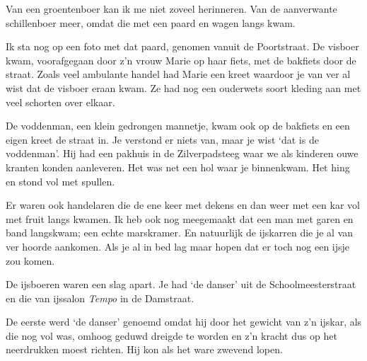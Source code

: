 \documentclass[12pt,twoside, openright]{memoir}
\begin{document}
Van een groentenboer kan ik me niet zoveel herinneren. Van de aanverwante schillenboer meer, omdat die met een paard en wagen langs kwam. 

Ik sta nog op een foto met dat paard, genomen vanuit de Poortstraat. De visboer kwam, voorafgegaan door z’n vrouw Marie op haar fiets, met de bakfiets door de straat. Zoals veel ambulante handel had Marie een kreet waardoor je van ver al wist dat de visboer eraan kwam. Ze had nog een ouderwets soort kleding aan met veel schorten over elkaar.

De voddenman, een klein gedrongen mannetje, kwam ook op de bakfiets en een eigen kreet de straat in. Je verstond er niets van, maar je wist `dat is de voddenman’. Hij had een pakhuis in de Zilverpadsteeg waar we als kinderen ouwe kranten konden aanleveren. Het was net een hol waar je binnenkwam. Het hing en stond vol met spullen. 

Er waren ook handelaren die de ene keer met dekens en dan weer met een kar vol met fruit langs kwamen. Ik heb ook nog meegemaakt dat een man met garen en band langskwam; een echte marskramer. En natuurlijk de ijskarren die je al van ver hoorde aankomen. Als je al in bed lag maar hopen dat er toch nog een ijsje zou komen.

De ijsboeren waren een slag apart. Je had `de danser’ uit de Schoolmeesterstraat en die van ijssalon \emph{Tempo} in de Damstraat. 

De eerste werd `de danser' genoemd omdat hij door het gewicht van z’n ijskar, als die nog vol was, omhoog geduwd dreigde te worden en z’n kracht dus op het neerdrukken moest richten. Hij kon als het ware zwevend lopen. 
\end{document}
